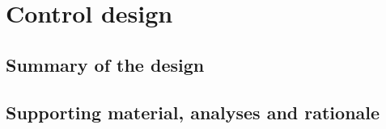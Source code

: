 \section{Control design}

\subsection{Summary of the design}
\subsection{Supporting material, analyses and rationale}